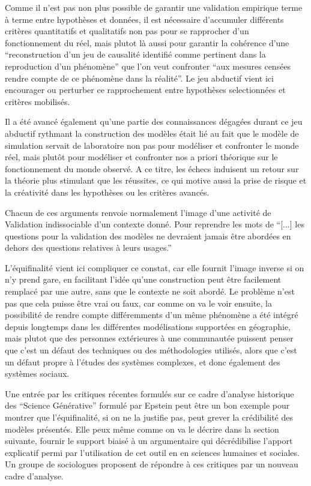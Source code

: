 Comme il n'est pas non plus possible de garantir une validation empirique terme à terme entre hypothèses et données, il est nécessaire d'accumuler différents critères quantitatifs et qualitatifs non pas pour se rapprocher d'un fonctionnement du réel, mais plutot là aussi pour garantir la cohérence d'une \enquote{reconstruction d'un jeu de causalité identifié comme pertinent dans la reproduction d'un phénomène} que l'on veut confronter \enquote{aux mesures censées rendre compte de ce phénomène dans la réalité}. Le jeu abductif vient ici encourager ou perturber ce rapprochement entre hypothèses selectionnées et critères mobilisés.

Il a été avancé également qu'une partie des connaissances dégagées durant ce jeu abductif rythmant la construction des modèles était lié au fait que le modèle de simulation servait de laboratoire non pas pour modéliser et confronter le monde réel, mais plutôt pour modéliser et confronter nos a priori théorique sur le fonctionnement du monde observé. A ce titre, les échecs induisent un retour sur la théorie plus stimulant que les réussites, ce qui motive aussi la prise de risque et la créativité dans les hypothèses ou les critères avancés.

Chacun de ces arguments renvoie normalement l'image d'une activité de Validation indissociable d'un contexte donné. Pour reprendre les mots de \textcite{Amblard2006} \enquote{[...] les questions pour la validation des modèles ne devraient jamais être abordées en dehors des questions relatives à leurs usages.} 

L'équifinalité vient ici compliquer ce constat, car elle fournit l'image inverse si on n'y prend gare, en facilitant l'idée qu'une construction peut être facilement remplacé par une autre, sans que le contexte ne soit abordé. Le problème n'est pas que cela puisse être vrai ou faux, car comme on va le voir ensuite, la possibilité de rendre compte différemments d'un même phénomène a été intégré depuis longtemps dans les différentes modélisations supportées en géographie, mais plutot que des personnes extérieures à une communautée puissent penser que c'est un défaut des techniques ou des méthodologies utilisés, alors que c'est un défaut propre à l'études des systèmes complexes, et donc également des systèmes sociaux. 

Une entrée par les critiques récentes formulés sur ce cadre d'analyse historique des \enquote{Science Générative} formulé par Epstein peut être un bon exemple pour montrer que l'équifinalité, si on ne la justifie pas, peut grever la crédibilité des modèles présentés. Elle peux même comme on va le décrire dans la section suivante, fournir le support biaisé à un argumentaire qui décrédibilise l'apport explicatif permi par l'utilisation de cet outil en en sciences humaines et sociales. Un groupe de sociologues proposent de répondre à ces critiques par un nouveau cadre d'analyse. 

